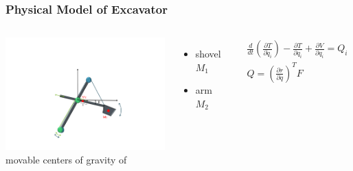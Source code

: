 \begin{frame}
	\frametitle{Physical Model of Excavator}
	\begin{columns}
		\centering
		\includegraphics[trim=30cm 5cm 30cm 23cm, clip=true, width=\linewidth]{img/Excavator_mass2}
		\vspace{1cm}\\
		movable centers of gravity of
		\begin{itemize}
			\item{shovel $M_1$}
			\item{arm $M_2$}
		\end{itemize}
		\vspace{0.7cm}
		\begin{small}
			\begin{align*}
				&\frac{d}{dt}\left(\frac{\partial T}{\partial \dot{q}_i}\right) -
				\frac{\partial T}{\partial q_i} +
				\frac{\partial V}{\partial q_i}
				= Q_i \\
				& Q = \left(\frac{\partial r}{\partial q}\right)^T F\\
			\end{align*}
		\end{small}
	\end{columns}
	
	
\end{frame}

